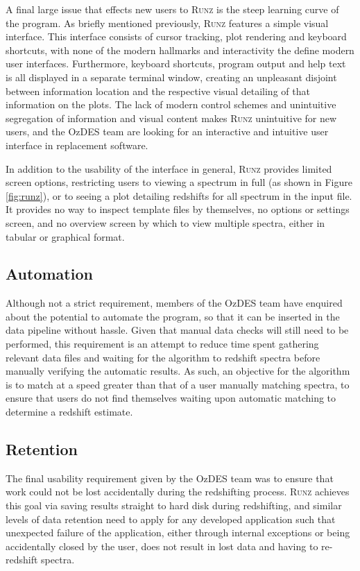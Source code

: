 \documentclass[titlesmallcaps, examinerscopy, copyrightpage]{uqthesis}
\newcommand{\runz}{\textsc{Runz}}
\begin{document}
A final large issue that effects new users to \textsc{Runz} is the steep learning curve of the program. As briefly mentioned previously, \runz{} features a simple visual interface. This interface consists of cursor tracking, plot rendering and keyboard shortcuts, with none of the modern hallmarks and interactivity the define modern user interfaces. Furthermore, keyboard shortcuts, program output and help text is all displayed in a separate terminal window, creating an unpleasant disjoint between information location and the respective visual detailing of that information on the plots. The lack of modern control schemes and unintuitive segregation of information and visual content makes \runz{} unintuitive for new users, and the OzDES team are looking for an interactive and intuitive user interface in replacement software.

In addition to the usability of the interface in general, \runz{} provides limited screen options, restricting users to viewing a spectrum in full (as shown in Figure \ref{fig:runz}), or to seeing a plot detailing redshifts for all spectrum in the input file. It provides no way to inspect template files by themselves, no options or settings screen, and no overview screen by which to view multiple spectra, either in tabular or graphical format.

\subsection{Automation}

Although not a strict requirement, members of the OzDES team have enquired about the potential to automate the program, so that it can be inserted in the data pipeline without hassle. Given that manual data checks will still need to be performed, this requirement is an attempt to reduce time spent gathering relevant data files and waiting for the algorithm to redshift spectra before manually verifying the automatic results. As such, an objective for the algorithm is to match at a speed greater than that of a user manually matching spectra, to ensure that users do not find themselves waiting upon automatic matching to determine a redshift estimate.

\subsection{Retention}

The final usability requirement given by the OzDES team was to ensure that work could not be lost accidentally during the redshifting process. \runz{} achieves this goal via saving results straight to hard disk during redshifting, and similar levels of data retention need to apply for any developed application such that unexpected failure of the application, either through internal exceptions or being accidentally closed by the user, does not result in lost data and having to re-redshift spectra.
\end{document}
